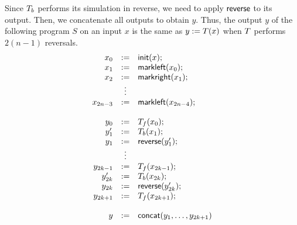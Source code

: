 Since $T_b$ performs its simulation in reverse, we need to apply
$\mathsf{reverse}$ to its output.
%
Then, we concatenate all outputs to obtain $y$.
%
Thus, the output $y$ of the following program $S$ on an input $x$ is the same
as
$y := T(x)$
when $T$ performs $2(n-1)$ reversals.
\[
\begin{array}{rcl}
x_0 &:=& \mathsf{init}(x); \\
x_1 &:=& \mathsf{markleft}(x_0); \\
x_2 &:=& \mathsf{markright}(x_1); \\
&\vdots& \\
x_{2n-3} &:=& \mathsf{markleft}(x_{2n-4}); \\
\\
y_0 &:=& T_f(x_0); \\
y'_1 &:=& T_b(x_1); \\
y_1 &:=& \mathsf{reverse}(y'_1); \\
&\vdots& \\
y_{2k-1} &:=& T_f(x_{2k-1}); \\
y'_{2k} &:=& T_b(x_{2k}); \\
y_{2k} &:=& \mathsf{reverse}(y'_{2k}); \\
y_{2k+1} &:=& T_f(x_{2k+1}); \\
\\
y &:=& \mathsf{concat}(y_1, \ldots, y_{2k+1})
\end{array}
\]


